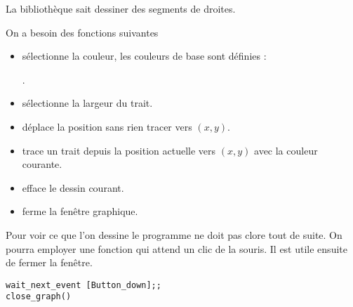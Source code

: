 La bibliothèque sait dessiner des segments de droites.

On a besoin des fonctions suivantes

\begin{itemize}
  \item {} sélectionne la couleur, les couleurs de base sont définies :
  
  .
  \item {} sélectionne la largeur du trait.
  \item {} déplace la position sans rien tracer vers $(x,y)$.
  \item {} trace un trait depuis la position actuelle vers $(x,y)$ avec la couleur courante.
  \item {} efface le dessin courant.
  \item {} ferme la fenêtre graphique.
\end{itemize}

\medskip

Pour voir ce que l'on dessine le programme ne doit pas clore tout de suite. On pourra employer une fonction qui attend un clic de la souris. Il est utile ensuite de fermer la fenêtre.
\begin{lstlisting}
wait_next_event [Button_down];;
close_graph()
\end{lstlisting}

